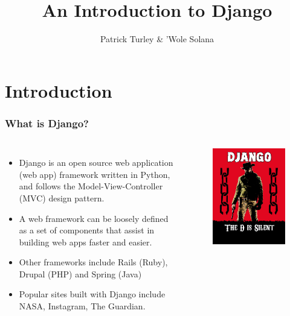 \documentclass[10pt,t,xcolor=dvipsnames]{beamer}
\title{ An Introduction to Django }
\author{ Patrick Turley \& 'Wole Solana }
\begin{document}
\nocite*{}
\frame [c, plain]{\titlepage}
\section{Introduction}
\begin{frame}
\frametitle{What is Django?}
\pause
\begin{columns}[l]
\begin{itemize}[<+->]
\item \alert{Django} is an open source web application (web app) framework written in Python, and follows the \alert{Model-View-Controller} (MVC) design pattern.
\item A \alert{web framework} can be loosely defined as a set of components that assist in building web apps faster and easier.
\item Other frameworks include Rails (Ruby), Drupal (PHP) and Spring (Java)
\item Popular sites built with Django include NASA, Instagram, The Guardian.
\end{itemize}
\begin{figure}
\centering
\includegraphics[scale=0.3]{../images/django.jpg}
\end{figure}
\end{columns}
\end{frame}
\end{document}
